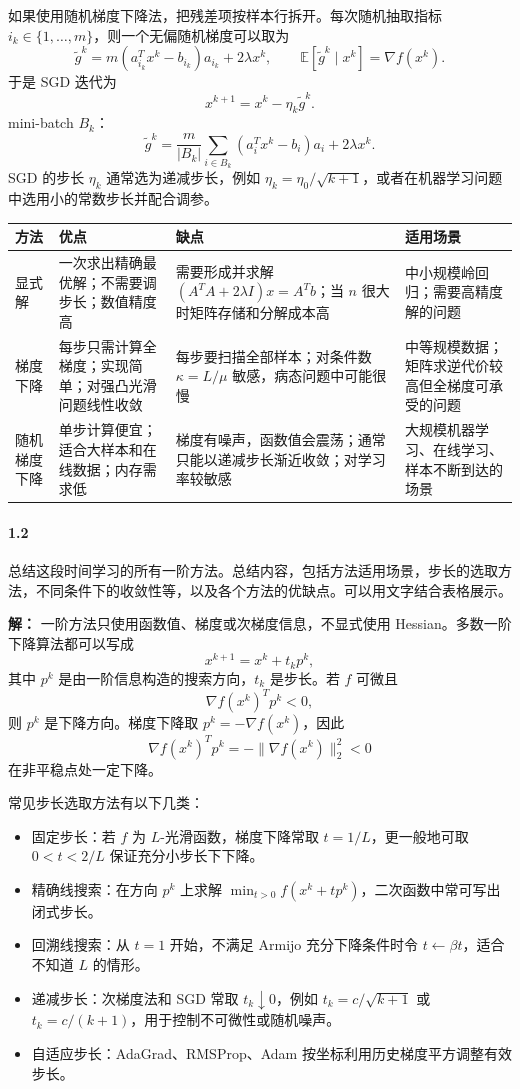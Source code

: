 \documentclass[12pt,a4paper]{article}
\begin{document}
如果使用随机梯度下降法，把残差项按样本行拆开。每次随机抽取指标 $i_k\in\{1,\ldots,m\}$，则一个无偏随机梯度可以取为
\[
  \tilde g^k
  =
  m(a_{i_k}^Tx^k-b_{i_k})a_{i_k}+2\lambda x^k,
  \qquad
  \mathbb E[\tilde g^k\mid x^k]=\nabla f(x^k).
\]
于是 SGD 迭代为
\[
  x^{k+1}=x^k-\eta_k\tilde g^k.
\]
 mini-batch $B_k$：
\[
  \tilde g^k
  =
  \frac{m}{|B_k|}
  \sum_{i\in B_k}(a_i^Tx^k-b_i)a_i
  +2\lambda x^k.
\]
SGD 的步长 $\eta_k$ 通常选为递减步长，例如 $\eta_k=\eta_0/\sqrt{k+1}$，或者在机器学习问题中选用小的常数步长并配合调参。

\begin{center}
\renewcommand{\arraystretch}{1.35}
\begin{tabular}{|p{2.3cm}|p{3.7cm}|p{3.7cm}|p{3.6cm}|}
\hline
方法 & 优点 & 缺点 & 适用场景 \\
\hline
显式解
& 一次求出精确最优解；不需要调步长；数值精度高
& 需要形成并求解 $(A^TA+2\lambda I)x=A^Tb$；当 $n$ 很大时矩阵存储和分解成本高
& 中小规模岭回归；需要高精度解的问题 \\
\hline
梯度下降
& 每步只需计算全梯度；实现简单；对强凸光滑问题线性收敛
& 每步要扫描全部样本；对条件数 $\kappa=L/\mu$ 敏感，病态问题中可能很慢
& 中等规模数据；矩阵求逆代价较高但全梯度可承受的问题 \\
\hline
随机梯度下降
& 单步计算便宜；适合大样本和在线数据；内存需求低
& 梯度有噪声，函数值会震荡；通常只能以递减步长渐近收敛；对学习率较敏感
& 大规模机器学习、在线学习、样本不断到达的场景 \\
\hline
\end{tabular}
\end{center}


\paragraph{1.2} 总结这段时间学习的所有一阶方法。总结内容，包括方法适用场景，步长的选取方法，不同条件下的收敛性等，以及各个方法的优缺点。可以用文字结合表格展示。

\textbf{解：}
一阶方法只使用函数值、梯度或次梯度信息，不显式使用 Hessian。多数一阶下降算法都可以写成
\[
  x^{k+1}=x^k+t_kp^k,
\]
其中 $p^k$ 是由一阶信息构造的搜索方向，$t_k$ 是步长。若 $f$ 可微且
\[
  \nabla f(x^k)^Tp^k<0,
\]
则 $p^k$ 是下降方向。梯度下降取 $p^k=-\nabla f(x^k)$，因此
\[
  \nabla f(x^k)^Tp^k=-\|\nabla f(x^k)\|_2^2<0
\]
在非平稳点处一定下降。

常见步长选取方法有以下几类：
\begin{itemize}
  \item 固定步长：若 $f$ 为 $L$-光滑函数，梯度下降常取 $t=1/L$，更一般地可取 $0<t<2/L$ 保证充分小步长下下降。
  \item 精确线搜索：在方向 $p^k$ 上求解 $\min_{t>0} f(x^k+tp^k)$，二次函数中常可写出闭式步长。
  \item 回溯线搜索：从 $t=1$ 开始，不满足 Armijo 充分下降条件时令 $t\leftarrow\beta t$，适合不知道 $L$ 的情形。
  \item 递减步长：次梯度法和 SGD 常取 $t_k\downarrow0$，例如 $t_k=c/\sqrt{k+1}$ 或 $t_k=c/(k+1)$，用于控制不可微性或随机噪声。
  \item 自适应步长：AdaGrad、RMSProp、Adam 按坐标利用历史梯度平方调整有效步长。
\end{itemize}
\end{document}
